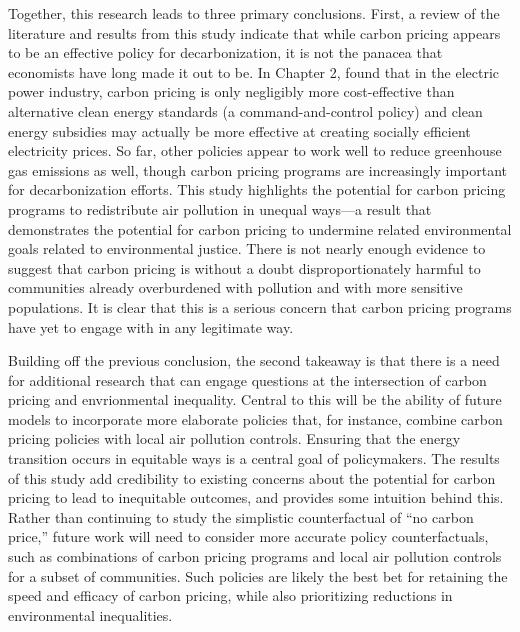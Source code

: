 Together, this research leads to three primary conclusions. First, a review of the literature and results from this study indicate that while carbon pricing appears to be an effective policy for decarbonization, it is not the panacea that economists have long made it out to be. In Chapter 2, \cite{borenstein2022carbon} found that in the electric power industry, carbon pricing is only negligibly more cost-effective than alternative clean energy standards (a command-and-control policy) and clean energy subsidies may actually be more effective at creating socially efficient electricity prices. So far, other policies appear to work well to reduce greenhouse gas emissions as well, though carbon pricing programs are increasingly important for decarbonization efforts. This study highlights the potential for carbon pricing programs to redistribute air pollution in unequal ways---a result that demonstrates the potential for carbon pricing to undermine related environmental goals related to environmental justice. There is not nearly enough evidence to suggest that carbon pricing is without a doubt disproportionately harmful to communities already overburdened with pollution and with more sensitive populations. It is clear that this is a serious concern that carbon pricing programs have yet to engage with in any legitimate way. 

Building off the previous conclusion, the second takeaway is that there is a need for additional research that can engage questions at the intersection of carbon pricing and envrionmental inequality. Central to this will be the ability of future models to incorporate more elaborate policies that, for instance, combine carbon pricing policies with local air pollution controls. Ensuring that the energy transition occurs in equitable ways is a central goal of policymakers. The results of this study add credibility to existing concerns about the potential for carbon pricing to lead to inequitable outcomes, and provides some intuition behind this. Rather than continuing to study the simplistic counterfactual of ``no carbon price,'' future work will need to consider more accurate policy counterfactuals, such as combinations of carbon pricing programs and local air pollution controls for a subset of communities. Such policies are likely the best bet for retaining the speed and efficacy of carbon pricing, while also prioritizing reductions in environmental inequalities. 

